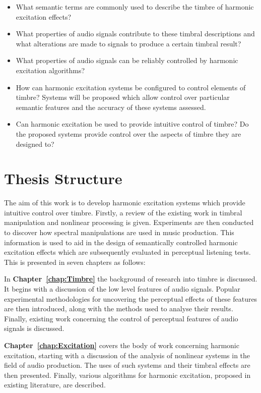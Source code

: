 	\begin{itemize}
		\item What semantic terms are commonly used to describe the timbre of harmonic excitation effects? 
		\item What properties of audio signals contribute to these timbral descriptions and what alterations are
		      made to signals to produce a certain timbral result?
		\item What properties of audio signals can be reliably controlled by harmonic excitation algorithms?
		\item How can harmonic excitation systems be configured to control elements of timbre? Systems will be
		      proposed which allow control over particular semantic features and the accuracy of these systems
		      assessed.
		\item Can harmonic excitation be used to provide intuitive control of timbre? Do the proposed systems
		      provide control over the aspects of timbre they are designed to?
	\end{itemize}

\section{Thesis Structure}
\label{sec:Introduction-ThesisStructure}
	The aim of this work is to develop harmonic excitation systems which provide intuitive control over timbre.
	Firstly, a review of the existing work in timbral manipulation and nonlinear processing is given. Experiments are
	then conducted to discover how spectral manipulations are used in music production. This information is used to aid
	in the design of semantically controlled harmonic excitation effects which are subsequently evaluated in perceptual
	listening tests. This is presented in seven chapters as follows:

	In {\bf{Chapter~\ref{chap:Timbre}}} the background of research into timbre is discussed. It begins with a discussion
	of the low level features of audio signals. Popular experimental methodologies for uncovering the perceptual effects
	of these features are then introduced, along with the methods used to analyse their results. Finally, existing work
	concerning the control of perceptual features of audio signals is discussed.

	{\bf{Chapter~\ref{chap:Excitation}}} covers the body of work concerning harmonic excitation, starting with a
	discussion of the analysis of nonlinear systems in the field of audio production. The uses of such systems and their
	timbral effects are then presented. Finally, various algorithms for harmonic excitation, proposed in existing
	literature, are described.

